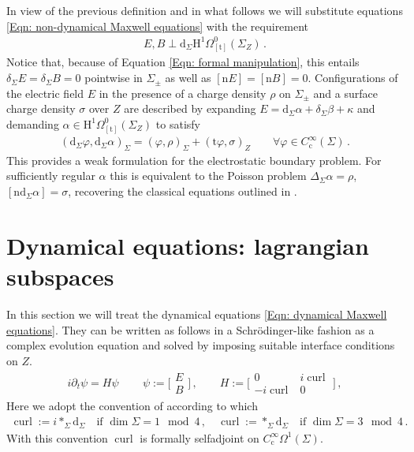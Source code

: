 	\noindent In view of the previous definition and in what follows we will substitute equations \eqref{Eqn: non-dynamical Maxwell equations} with the requirement
	\begin{align}\label{Eqn: non-dynamical Maxwell equations with Hodge decomposition}
		E,B\perp\mathrm{d}_\Sigma\mathrm{H}^1\Omega^0_{[\mathrm{t}]}(\Sigma_Z)\,.
	\end{align}
	Notice that, because of Equation \eqref{Eqn: formal manipulation}, this entails $\delta_\Sigma E=\delta_\Sigma B=0$ pointwise in $\Sigma_\pm$ as well as $[\mathrm{n}E]=[\mathrm{n}B]=0$.
	Configurations of the electric field $E$ in the presence of a charge density $\rho$ on $\Sigma_\pm$ and a surface charge density $\sigma$ over $Z$ are described by expanding $E=\mathrm{d}_\Sigma\alpha+\delta_\Sigma\beta+\kappa$ and demanding $\alpha\in\mathrm{H}^1\Omega^0_{[\mathrm{t}]}(\Sigma_Z)$ to satisfy
	\begin{align*}
		(\mathrm{d}_\Sigma\varphi,\mathrm{d}_\Sigma\alpha)_\Sigma=
		(\varphi,\rho)_\Sigma+(\mathrm{t}\varphi,\sigma)_{Z}\qquad
		\forall\varphi\in C^\infty_{\mathrm{c}}(\Sigma)\,.
	\end{align*}
	This provides a weak formulation for the electrostatic boundary problem. For sufficiently regular $\alpha$ this is equivalent to the Poisson problem $\Delta_\Sigma\alpha=\rho$, $[\mathrm{n}\mathrm{d}_\Sigma\alpha]=\sigma$, recovering the classical equations outlined in \cite[Sec. I.5]{Jackson-99}.

\section{Dynamical equations: lagrangian subspaces}\label{Sec: dynamical equations: boundary triples}
In this section we will treat the dynamical equations \eqref{Eqn: dynamical Maxwell equations}.
They can be written as follows in a Schr\"odinger-like fashion as a complex evolution equation and solved by imposing suitable interface conditions on $Z$.
\begin{align}\label{Eqn: dynamical eqns in Schroedinger form}
	i\partial_t\psi=H\psi\,\qquad
	\psi:=\bigg[\begin{matrix}E\\B\end{matrix}\bigg]\,,\qquad
	H:=\bigg[\begin{matrix}0&i\operatorname{curl}\\-i\operatorname{curl}&0\end{matrix}\bigg]\,,
\end{align}
Here we adopt the convention of \cite{Baer-19} according to which
\begin{align}\label{Eqn: curl convention}
	\operatorname{curl}:=i\ast_\Sigma\mathrm{d}_\Sigma\quad\textrm{if }\dim\Sigma=1\mod 4\,,\quad
	\operatorname{curl}:=\ast_\Sigma\mathrm{d}_\Sigma\quad\textrm{if }\dim\Sigma=3\mod 4\,.
\end{align}
With this convention $\operatorname{curl}$ is formally selfadjoint on $C^\infty_{\mathrm{c}}\Omega^1(\Sigma)$.


